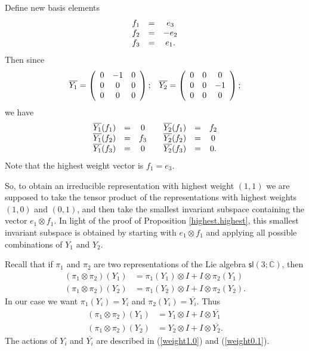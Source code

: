 \documentclass[12pt]{amsbook}
\theoremstyle{plain}
\numberwithin{equation}{chapter}
\numberwithin{theorem}{chapter}
\begin{document}
Define new basis elements
\[%
\begin{array}
[c]{ccc}%
f_{1} & = & e_{3}\\
f_{2} & = & -e_{2}\\
f_{3} & = & e_{1}\text{.}%
\end{array}
\]
Then since
\[%
\begin{array}
[c]{cc}%
\overline{Y_{1}}=\left(
\begin{array}
[c]{ccc}%
0 & -1 & 0\\
0 & 0 & 0\\
0 & 0 & 0
\end{array}
\right)  ; & \overline{Y_{2}}=\left(
\begin{array}
[c]{ccc}%
0 & 0 & 0\\
0 & 0 & -1\\
0 & 0 & 0
\end{array}
\right)  ;
\end{array}
\]
we have
\begin{equation}%
\begin{array}
[c]{ccccccc}%
\overline{Y_{1}}(f_{1}) & = & 0 &  & \overline{Y_{2}}(f_{1}) & = & f_{2}\\
\overline{Y_{1}}(f_{2}) & = & f_{3} &  & \overline{Y_{2}}(f_{2}) & = & 0\\
\overline{Y_{1}}(f_{3}) & = & 0 &  & \overline{Y_{2}}(f_{3}) & = & 0\text{.}%
\end{array}
\label{weight0.1}%
\end{equation}
Note that the highest weight vector is $f_{1}=e_{3}$.

So, to obtain an irreducible representation with highest weight $\left(
1,1\right)  $ we are supposed to take the tensor product of the
representations with highest weights $\left(  1,0\right)  $ and $\left(
0,1\right)  $, and then take the smallest invariant subspace containing the
vector $e_{1}\otimes f_{1}$. In light of the proof of Proposition
\ref{highest.highest}, this smallest invariant subspace is obtained by
starting with $e_{1}\otimes f_{1}$ and applying all possible combinations of
$Y_{1}$ and $Y_{2}$.

Recall that if $\pi_{1}$ and $\pi_{2}$ are two representations of the Lie
algebra $\mathsf{sl}\left(  3;\mathbb{C}\right)  $, then
\begin{align*}
\left(  \pi_{1}\otimes\pi_{2}\right)  (Y_{1})  & =\pi_{1}(Y_{1})\otimes
I+I\otimes\pi_{2}(Y_{1})\\
\left(  \pi_{1}\otimes\pi_{2}\right)  (Y_{2})  & =\pi_{1}(Y_{2})\otimes
I+I\otimes\pi_{2}(Y_{2})\text{.}%
\end{align*}
In our case we want $\pi_{1}(Y_{i})=Y_{i}$ and $\pi_{2}(Y_{i})=\overline
{Y_{i}}$. Thus
\begin{align*}
\left(  \pi_{1}\otimes\pi_{2}\right)  (Y_{1})  & =Y_{1}\otimes I+I\otimes
\overline{Y_{1}}\\
\left(  \pi_{1}\otimes\pi_{2}\right)  (Y_{2})  & =Y_{2}\otimes I+I\otimes
\overline{Y_{2}}\text{.}%
\end{align*}
The actions of $Y_{i}$ and $\overline{Y_{i}}$ are described in
(\ref{weight1.0}) and (\ref{weight0.1}).
\end{document}
